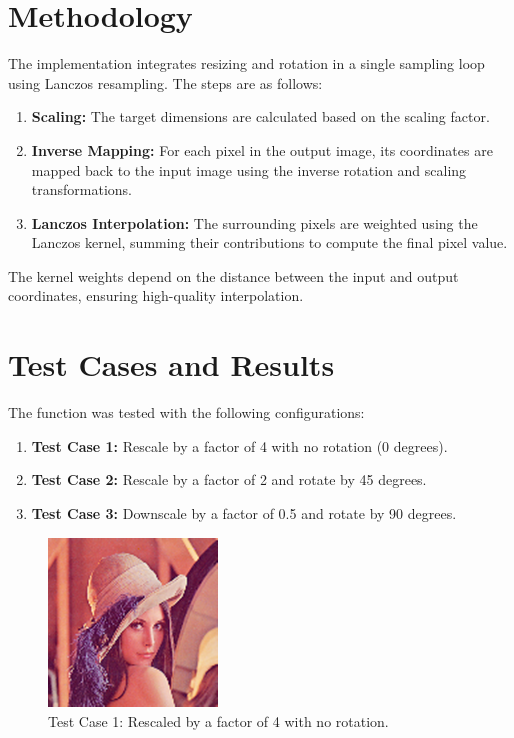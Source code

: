 \documentclass{article}
\begin{document}
\section{Methodology}

The implementation integrates resizing and rotation in a single sampling loop using Lanczos resampling. The steps are as follows:

\begin{enumerate}
    \item \textbf{Scaling:} The target dimensions are calculated based on the scaling factor.
    \item \textbf{Inverse Mapping:} For each pixel in the output image, its coordinates are mapped back to the input image using the inverse rotation and scaling transformations.
    \item \textbf{Lanczos Interpolation:} The surrounding pixels are weighted using the Lanczos kernel, summing their contributions to compute the final pixel value.
\end{enumerate}

The kernel weights depend on the distance between the input and output coordinates, ensuring high-quality interpolation.

\section{Test Cases and Results}

The function was tested with the following configurations:
\begin{enumerate}
    \item \textbf{Test Case 1:} Rescale by a factor of 4 with no rotation (0 degrees).
    \item \textbf{Test Case 2:} Rescale by a factor of 2 and rotate by 45 degrees.
    \item \textbf{Test Case 3:} Downscale by a factor of 0.5 and rotate by 90 degrees.
\end{enumerate}

\begin{figure}[h!]
    \centering
    \includegraphics[width=0.4\textwidth]{lena_4.00@0.00.png}
    \caption{Test Case 1: Rescaled by a factor of 4 with no rotation.}
\end{figure}
\end{document}
